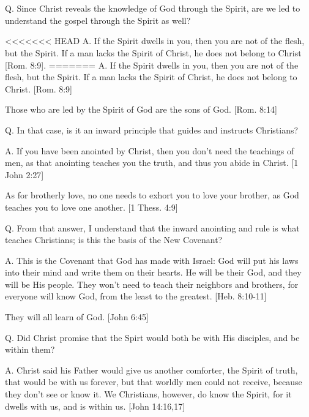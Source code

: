 \documentclass[../main.tex]{subfiles}
\begin{document}
	

	\section*{}
	Q. Since Christ reveals the knowledge of God through the Spirit, are we led to understand the gospel through the Spirit as well?
	
<<<<<<< HEAD
	A. If the Spirit dwells in you, then you are not of the flesh, but the Spirit. If a man lacks the Spirit of Christ, he does not belong to Christ [Rom. 8:9]. 
=======
	A. If the Spirit dwells in you, then you are not of the flesh, but the Spirit. If a man lacks the Spirit of Christ, he does not belong to Christ. [Rom. 8:9]
	
	Those who are led by the Spirit of God are the sons of God. [Rom. 8:14]
	
	Q. In that case, is it an inward principle that guides and instructs Christians?
	
	A. If you have been anointed by Christ, then you don't need the teachings of men, as that anointing teaches you the truth, and thus you abide in Christ. [1 John 2:27]
	
	As for brotherly love, no one needs to exhort you to love your brother, as God teaches you to love one another. [1 Thess. 4:9]
	
	Q. From that answer, I understand that the inward anointing and rule is what teaches Christians; is this the basis of the New Covenant?
	
	A. This is the Covenant that God has made with Israel: God will put his laws into their mind and write them on their hearts. He will be their God, and they will be His people. They won't need to teach their neighbors and brothers, for everyone will know God, from the least to the greatest. [Heb. 8:10-11] 
	
	They will all learn of God. [John 6:45]
	
	Q. Did Christ promise that the Spirt would both be with His disciples, and be within them?
	
	A. Christ said his Father would give us another comforter, the Spirit of truth, that would be with us forever, but that worldly men could not receive, because they don't see or know it. We Christians, however, do know the Spirit, for it dwells with us, and is within us. [John 14:16,17]
	
\end{document}
